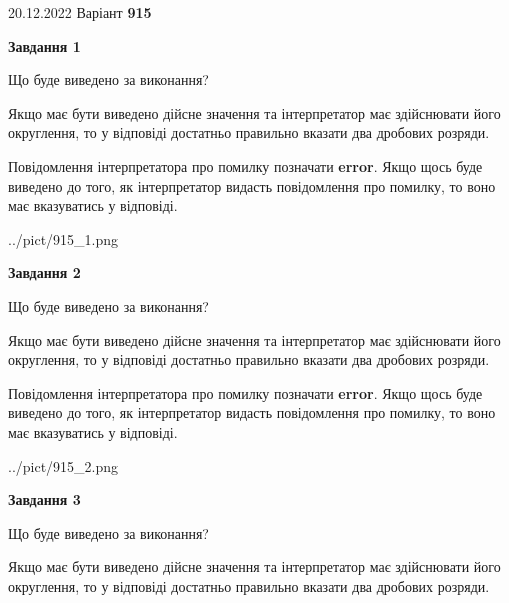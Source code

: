 \documentclass[12pt, ukrainian]{article}
\begin{document}
{20.12.2022 Варіант \No \textbf { 915 }\par}
{
\begin {Large}

{\begin {center}\textbf{Завдання 1}\end {center}}\par
Що буде виведено за виконання? \par

Якщо має бути виведено дійсне значення та інтерпретатор має здійснювати його округлення, 
то у відповіді достатньо правильно вказати два дробових розряди.

Повідомлення інтерпретатора про помилку позначати \textbf{error}.
Якщо щось буде виведено до того, як інтерпретатор видасть повідомлення про помилку, 
то воно має вказуватись у відповіді. \par

\begin{center}
	{../pict/915_1.png}
\end{center}
\newpage

{\begin {center}\textbf{Завдання 2}\end {center}}\par
Що буде виведено за виконання? \par

Якщо має бути виведено дійсне значення та інтерпретатор має здійснювати його округлення, 
то у відповіді достатньо правильно вказати два дробових розряди.

Повідомлення інтерпретатора про помилку позначати \textbf{error}.
Якщо щось буде виведено до того, як інтерпретатор видасть повідомлення про помилку, 
то воно має вказуватись у відповіді. \par

\begin{center}
	{../pict/915_2.png}
\end{center}
\newpage

{\begin {center}\textbf{Завдання 3}\end {center}}\par
Що буде виведено за виконання? \par

Якщо має бути виведено дійсне значення та інтерпретатор має здійснювати його округлення, 
то у відповіді достатньо правильно вказати два дробових розряди.


\end{Large}}
\end{document}
